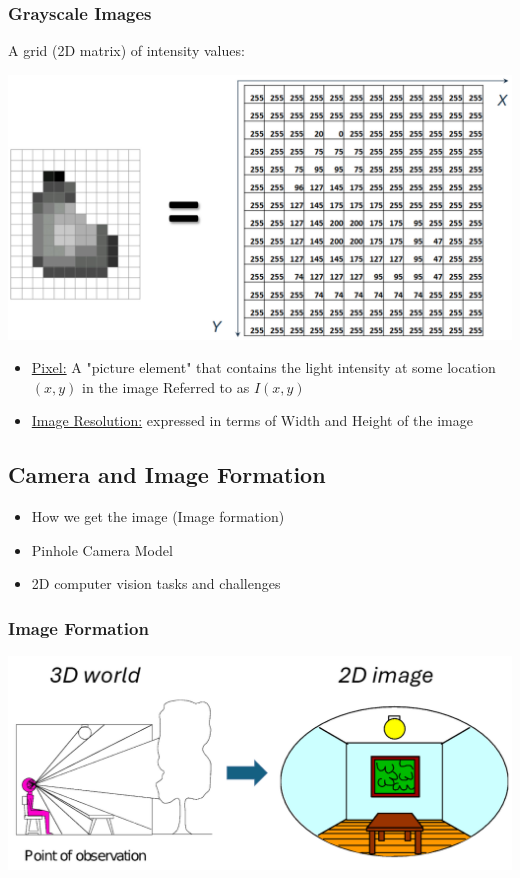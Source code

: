 \documentclass[10pt]{article}
\begin{document}
\subsubsection*{Grayscale Images}
A grid (2D matrix) of intensity values:
\begin{center} 
	\includegraphics*[width=\textwidth]{L1_5.png} 
\end{center}
\begin{itemize}
	\item \underline{Pixel:} A "picture element" that contains the light intensity at some location $(x, y)$ in the image Referred to as $I(x, y)$
	\item \underline{Image Resolution:} expressed in terms of Width and Height of the image
\end{itemize}

\subsection*{Camera and Image Formation}
\begin{itemize}
	\item How we get the image (Image formation)
	\item Pinhole Camera Model
	\item 2D computer vision tasks and challenges
\end{itemize}

\subsubsection*{Image Formation}
\begin{center} 
	\includegraphics*[width=\textwidth]{L1_6.png} 
\end{center}
\end{document}
